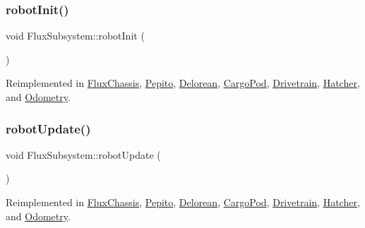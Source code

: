 \mbox{\label{classFluxSubsystem_aacd5ddfcadda0866d5e838de09a60d63}} 
\subsubsection{\texorpdfstring{robot\+Init()}{robotInit()}}
{\footnotesize\ttfamily void Flux\+Subsystem\+::robot\+Init (\begin{DoxyParamCaption}{ }\end{DoxyParamCaption})\hspace{0.3cm}{\ttfamily [virtual]}}



Reimplemented in \hyperlink{classFluxChassis_a32d9d7767f8ce15fdd10f8116145e408}{Flux\+Chassis}, \hyperlink{classPepito_a1eed9bef768f3694d8bdfb4f610b8e3a}{Pepito}, \hyperlink{classDelorean_a591e1b68a21a82c7e1cf4e7dbf5294a2}{Delorean}, \hyperlink{classCargoPod_a28aaa86f3e7ee713748f4e9b1a136fd8}{Cargo\+Pod}, \hyperlink{classDrivetrain_a7e9c10a27b3cc5ad89f2338de39b7c62}{Drivetrain}, \hyperlink{classHatcher_ae917b572274b45c8e695cd8e285a5d70}{Hatcher}, and \hyperlink{classOdometry_a84379c5878ad6dd502297e6f956298f9}{Odometry}.

\mbox{\label{classFluxSubsystem_ac2b1c08b53251870e945edf7080c1549}} 
\subsubsection{\texorpdfstring{robot\+Update()}{robotUpdate()}}
{\footnotesize\ttfamily void Flux\+Subsystem\+::robot\+Update (\begin{DoxyParamCaption}{ }\end{DoxyParamCaption})\hspace{0.3cm}{\ttfamily [virtual]}}



Reimplemented in \hyperlink{classFluxChassis_ad76138955ede1324ba7d4da824cb39f3}{Flux\+Chassis}, \hyperlink{classPepito_a0894a64d02550bb35b4e3eefa3ac4934}{Pepito}, \hyperlink{classDelorean_a47b9cfdb59a6f46ee26f45f794e313c1}{Delorean}, \hyperlink{classCargoPod_a22723a1f9685242aca13e6bc44e3f0a2}{Cargo\+Pod}, \hyperlink{classDrivetrain_a2a2b5976426dc0c1f45438fd7a5926e4}{Drivetrain}, \hyperlink{classHatcher_aacf85f8cc9f1c523ef7c4cd91808201e}{Hatcher}, and \hyperlink{classOdometry_a4c82fa784546795d6b0bf32c1b919202}{Odometry}.

